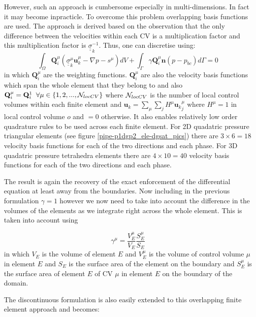 However, such an approach is cumbersome especially in multi-dimensions.
In fact it may become inpracticle. To overcome this
problem overlapping basis functions are used. The approach is derived
based on the observation
that the only difference between the velocities
within each CV is a multiplication factor
and this multiplication factor is ${\underline {\underline \sigma}}_k^{-1}$.
Thus, one can discretise
using:
\begin{equation}
\int_\Omega {\mathbf Q}_i^\mu ({\underline{\underline\sigma}}_k^\mu {\mathbf u}_k^\mu - \nabla p -s^\mu) dV +
\int_{\Gamma}\gamma {\mathbf Q}_i^\mu {\mathbf n} (p-p_{bc}) d\Gamma =0
\label{pipe-overlap-eqn}
\end{equation}
in which ${\mathbf Q}_i^\mu$ are the weighting functions.
${\mathbf Q}_i^\mu$ are also the
velocity basis functions which span the whole
element that they belong to
and also ${\mathbf Q}_i^\mu={\mathbf Q}_i^1\;\; \forall \mu\in\{1,2,...,{\cal N}_{locCV}\}$
where ${\cal N}_{locCV}$ is the number of local control volumes within each
finite element and ${\mathbf u}_k =\sum_\mu \sum_j H^\mu {{\mathbf u}_k}_j^\mu$ where
$H^\mu=1$ in local control volume $o$ and $=0$ otherwise.
It also enables relatively low order quadrature rules to be used
across each finite element.
For 2D quadatric pressure triangular elements (see figure \ref{pipe-p1dgp2_ele-dgsat_pics})
there are $3\times6=18$ velocity basis
functions for each of the two directions and each phase.
For 3D quadatric pressure
tetrahedra elements there are $4\times 10=40$ velocity basis
functions for each of the two directions and each phase.

The result is again the recovery of the exact enforcement of
the differential equation at least away from the boundaries.
Now including in the previous formulation $\gamma=1$ however
we now need to take into account the difference in the
volumes of the elements as we integrate right
across the whole element. This is taken into account
using

\begin{equation}
\gamma^\mu = \frac{V^\mu_E}{V_E} \frac{S^\mu_E}{S_E}
\label{pipe-overlap-eqn-gamma}
\end{equation}
in which $V_E$ is the volume of element $E$
and $V^\mu_E$ is the volume of control volume $\mu$
in element $E$ and $S_E$ is the surface area of the element
on the boundary and $S^\mu_E$ is the surface
area of element $E$ of CV $\mu$ in element $E$ on the boundary
of the domain.

The discontinuous formulation is also easily extended
to this overlapping finite element approach and becomes:

